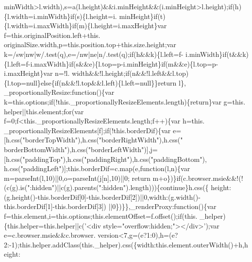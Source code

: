 \begin{DoxyCode}
      minWidth>l.width),s=a(l.height)&&i.minHeight&&(i.minHeight>l.height);\textcolor{keywordflow}{if}(h)\{l.width=i.minWidth\}\textcolor{keywordflow}{if}(s)\{l.height=i.
      minHeight\}\textcolor{keywordflow}{if}(t)\{l.width=i.maxWidth\}\textcolor{keywordflow}{if}(m)\{l.height=i.maxHeight\}var f=this.originalPosition.left+this.
      originalSize.width,p=this.position.top+this.size.height;var k=/sw|nw|w/.test(q),e=/nw|ne|n/.test(q);\textcolor{keywordflow}{if}(h&&k)\{l.left=f-
      i.minWidth\}\textcolor{keywordflow}{if}(t&&k)\{l.left=f-i.maxWidth\}\textcolor{keywordflow}{if}(s&&e)\{l.top=p-i.minHeight\}\textcolor{keywordflow}{if}(m&&e)\{l.top=p-i.maxHeight\}var n=!l.
      width&&!l.height;\textcolor{keywordflow}{if}(n&&!l.left&&l.top)\{l.top=null\}\textcolor{keywordflow}{else}\{\textcolor{keywordflow}{if}(n&&!l.top&&l.left)\{l.left=null\}\}\textcolor{keywordflow}{return} l\},
      \_proportionallyResize:\textcolor{keyword}{function}()\{var k=this.options;\textcolor{keywordflow}{if}(!this.\_proportionallyResizeElements.length)\{\textcolor{keywordflow}{return}\}var g=this.
      helper||this.element;\textcolor{keywordflow}{for}(var f=0;f<this.\_proportionallyResizeElements.length;f++)\{var h=this.
      \_proportionallyResizeElements[f];\textcolor{keywordflow}{if}(!this.borderDif)\{var e=[h.css(\textcolor{stringliteral}{"borderTopWidth"}),h.css(\textcolor{stringliteral}{"borderRightWidth"}),h.css(\textcolor{stringliteral}{"
      borderBottomWidth"}),h.css(\textcolor{stringliteral}{"borderLeftWidth"})],j=[h.css(\textcolor{stringliteral}{"paddingTop"}),h.css(\textcolor{stringliteral}{"paddingRight"}),h.css(\textcolor{stringliteral}{"paddingBottom"}),
      h.css(\textcolor{stringliteral}{"paddingLeft"})];this.borderDif=c.map(e,\textcolor{keyword}{function}(l,n)\{var m=parseInt(l,10)||0,o=parseInt(j[n],10)||0;\textcolor{keywordflow}{
      return} m+o\})\}\textcolor{keywordflow}{if}(c.browser.msie&&!(!(c(g).is(\textcolor{stringliteral}{":hidden"})||c(g).parents(\textcolor{stringliteral}{":hidden"}).length)))\{\textcolor{keywordflow}{continue}\}h.css(\{
      height:(g.height()-this.borderDif[0]-this.borderDif[2])||0,width:(g.width()-this.borderDif[1]-this.borderDif[3])
      ||0\})\}\},\_renderProxy:\textcolor{keyword}{function}()\{var f=this.element,i=this.options;this.elementOffset=f.offset();\textcolor{keywordflow}{if}(this.
      \_helper)\{this.helper=this.helper||c(\textcolor{stringliteral}{'<div style="overflow:hidden;"></div>'});var e=c.browser.msie&&c.browser.
      version<7,g=(e?1:0),h=(e?2:-1);this.helper.addClass(this.\_helper).css(\{width:this.element.outerWidth()+h,height:

\end{DoxyCode}
